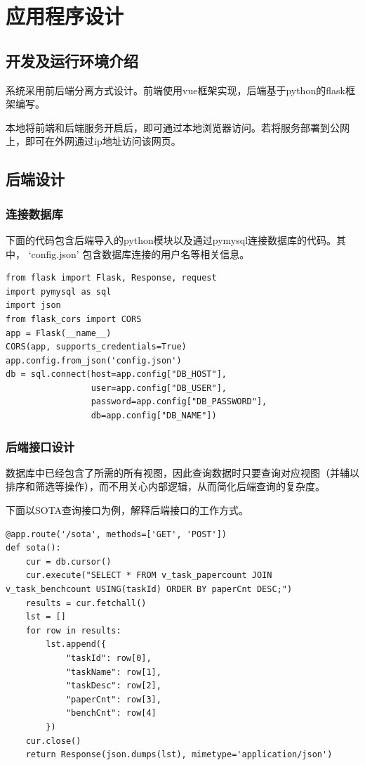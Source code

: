 \chapter{应用程序设计}

\section{开发及运行环境介绍}

系统采用前后端分离方式设计。前端使用vue框架实现，后端基于python的flask框架编写。

本地将前端和后端服务开启后，即可通过本地浏览器访问。若将服务部署到公网上，即可在外网通过ip地址访问该网页。

\section{后端设计}

\subsection{连接数据库}

下面的代码包含后端导入的python模块以及通过pymysql连接数据库的代码。其中， `config.json' 包含数据库连接的用户名等相关信息。

\scriptsize
\begin{verbatim}
from flask import Flask, Response, request
import pymysql as sql
import json
from flask_cors import CORS
app = Flask(__name__)
CORS(app, supports_credentials=True)
app.config.from_json('config.json')
db = sql.connect(host=app.config["DB_HOST"],
                 user=app.config["DB_USER"],
                 password=app.config["DB_PASSWORD"],
                 db=app.config["DB_NAME"])
\end{verbatim}
\normalsize

\subsection{后端接口设计}

数据库中已经包含了所需的所有视图，因此查询数据时只要查询对应视图（并辅以排序和筛选等操作），而不用关心内部逻辑，从而简化后端查询的复杂度。

下面以SOTA查询接口为例，解释后端接口的工作方式。

\scriptsize
\begin{verbatim}
@app.route('/sota', methods=['GET', 'POST'])
def sota():
    cur = db.cursor()
    cur.execute("SELECT * FROM v_task_papercount JOIN v_task_benchcount USING(taskId) ORDER BY paperCnt DESC;")
    results = cur.fetchall()
    lst = []
    for row in results:
        lst.append({
            "taskId": row[0],
            "taskName": row[1],
            "taskDesc": row[2],
            "paperCnt": row[3],
            "benchCnt": row[4]
        })
    cur.close()
    return Response(json.dumps(lst), mimetype='application/json')
\end{verbatim}
\normalsize

